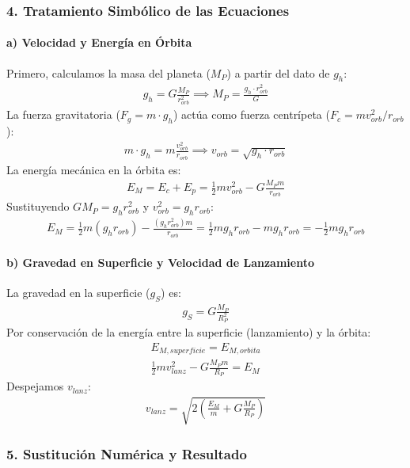 \subsubsection*{4. Tratamiento Simbólico de las Ecuaciones}
\paragraph*{a) Velocidad y Energía en Órbita}
Primero, calculamos la masa del planeta ($M_P$) a partir del dato de $g_h$:
\begin{gather}
    g_h = G \frac{M_P}{r_{orb}^2} \implies M_P = \frac{g_h \cdot r_{orb}^2}{G}
\end{gather}
La fuerza gravitatoria ($F_g = m \cdot g_h$) actúa como fuerza centrípeta ($F_c = m v_{orb}^2 / r_{orb}$):
\begin{gather}
    m \cdot g_h = m \frac{v_{orb}^2}{r_{orb}} \implies v_{orb} = \sqrt{g_h \cdot r_{orb}}
\end{gather}
La energía mecánica en la órbita es:
\begin{gather}
    E_M = E_c + E_p = \frac{1}{2} m v_{orb}^2 - G \frac{M_P m}{r_{orb}}
\end{gather}
Sustituyendo $G M_P = g_h r_{orb}^2$ y $v_{orb}^2 = g_h r_{orb}$:
\begin{gather}
    E_M = \frac{1}{2} m (g_h r_{orb}) - \frac{(g_h r_{orb}^2) m}{r_{orb}} = \frac{1}{2} m g_h r_{orb} - m g_h r_{orb} = -\frac{1}{2} m g_h r_{orb}
\end{gather}
\paragraph*{b) Gravedad en Superficie y Velocidad de Lanzamiento}
La gravedad en la superficie ($g_S$) es:
\begin{gather}
    g_S = G \frac{M_P}{R_P^2}
\end{gather}
Por conservación de la energía entre la superficie (lanzamiento) y la órbita:
\begin{gather}
    E_{M, superficie} = E_{M, orbita} \nonumber \\[8pt]
    \frac{1}{2} m v_{lanz}^2 - G \frac{M_P m}{R_P} = E_M
\end{gather}
Despejamos $v_{lanz}$:
\begin{gather}
    v_{lanz} = \sqrt{2 \left( \frac{E_M}{m} + G \frac{M_P}{R_P} \right)}
\end{gather}

\subsubsection*{5. Sustitución Numérica y Resultado}
